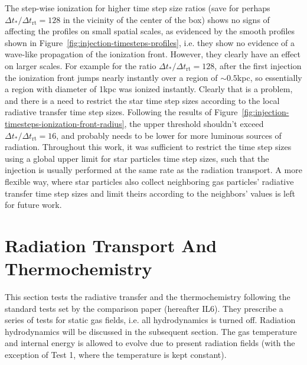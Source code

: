 The step-wise ionization for higher time step size ratios (save for perhaps $\Delta t_* / \Delta
t_{\mathrm{rt}} = 128$ in the vicinity of the center of the box) shows no signs of affecting the
profiles on small spatial scales, as evidenced by the smooth profiles shown in
Figure~\ref{fig:injection-timesteps-profiles}, i.e. they show no evidence of a wave-like propagation
of the ionization front. However, they clearly have an effect on larger scales. For example for the
ratio $\Delta t_* / \Delta t_{\mathrm{rt}} = 128$, after the first injection the ionization front
jumps nearly instantly over a region of $\sim 0.5$kpc, so essentially a region with diameter of
1kpc was ionized instantly. Clearly that is a problem, and there is a need to restrict the star
time step sizes according to the local radiative transfer time step sizes. Following the results of
Figure~\ref{fig:injection-timesteps-ionization-front-radius}, the upper threshold shouldn't exceed
$\Delta t_* / \Delta t_{\mathrm{rt}} = 16$, and probably needs to be lower for more luminous sources
of radiation.  Throughout this work, it was sufficient to restrict the time step sizes using a
global upper limit for star particles time step sizes, such that the injection is usually performed
at the same rate as the radiation transport. A more flexible way, where star particles also collect
neighboring gas particles' radiative transfer time step sizes and limit theirs according to the
neighbors' values is left for future work.






















\section{Radiation Transport And Thermochemistry}\label{chap:IL6}

This section tests the radiative transfer and the thermochemistry following the standard tests set
by the comparison paper \cite{ilievCosmologicalRadiativeTransfer2006} (hereafter IL6). They
prescribe a series of tests for static gas fields, i.e. all hydrodynamics is turned off. Radiation
hydrodynamics will be discussed in the subsequent section. The gas temperature and internal energy
is allowed to evolve due to present radiation fields (with the exception of Test 1, where the
temperature is kept constant).

